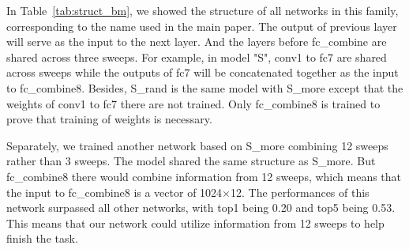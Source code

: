 In Table~\ref{tab:struct_bm}, we showed the structure of all networks in this family, corresponding to the name used in the main paper.
The output of previous layer will serve as the input to the next layer.
And the layers before fc\_combine are shared across three sweeps. For example, in model "S", conv1 to fc7 are shared across sweeps while the outputs of fc7 will be concatenated together as the input to fc\_combine8.
Besides, S\_rand is the same model with S\_more except that the weights of conv1 to fc7 there are not trained.
Only fc\_combine8 is trained to prove that training of weights is necessary.

Separately, we trained another network based on S\_more combining 12 sweeps rather than 3 sweeps. The model shared the same structure as S\_more. 
But fc\_combine8 there would combine information from 12 sweeps, which means that the input to fc\_combine8 is a vector of 1024$\times$12. 
The performances of this network surpassed all other networks, with top1 being 0.20 and top5 being 0.53. This means that our network could utilize information from 12 sweeps to help finish the task.

